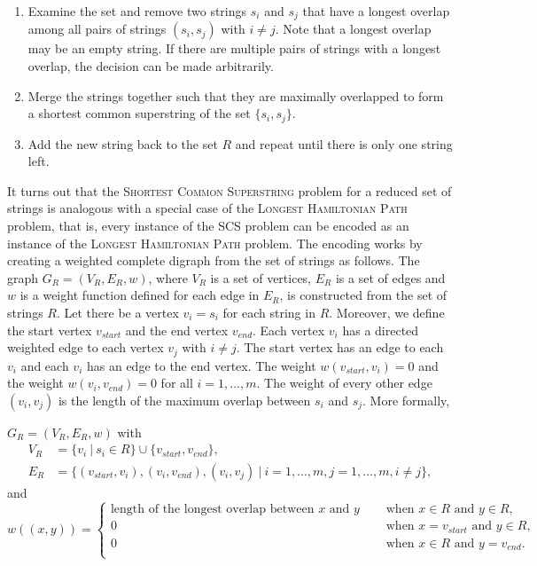 \documentclass[english,twoside,censored,csm,algorithms-track-2020]{HYthesisML}
\theoremstyle{plain}
\theoremstyle{definition}
\begin{document}
\vspace{1cm}
\begin{enumerate}
\item Examine the set and remove two strings $s_i$ and $s_j$ that have a longest overlap among all pairs of strings $(s_i, s_j)$ with $i\neq j$. Note that a longest overlap may be an empty string. If there are multiple pairs of strings with a longest overlap, the decision can be made arbitrarily.
\item Merge the strings together such that they are maximally overlapped to form a shortest common superstring of the set $\{s_i, s_j\}$.
  \item Add the new string back to the set $R$ and repeat until there is only one string left.
\end{enumerate}

It turns out that the \textsc{Shortest Common Superstring} problem for a reduced set of strings is
analogous with a special case of
the \textsc{Longest Hamiltonian Path} problem, that is, every instance of the SCS problem can be encoded
as an instance of the \textsc{Longest Hamiltonian Path} problem. The encoding works by creating a weighted
complete digraph from the set of strings as follows. 
The graph $G_R=(V_R,E_R,w)$, where $V_R$ is a set of vertices, $E_R$ is a set of edges and $w$ is a
 weight function defined for each edge in $E_R$, is constructed from the set of strings $R$.
Let there be a vertex $v_i=s_i$ for each string in $R$. Moreover, we define the start vertex
$v_{start}$ and the end vertex $v_{end}$. Each vertex $v_i$ has a directed weighted edge to each vertex
$v_j$ with $i\neq j$. The start vertex has an edge to each $v_i$ and each $v_i$ has an edge to the
end vertex. The weight $w(v_{start}, v_i) = 0$ and the weight $w(v_i, v_{end}) = 0$ for all $i=1,...,m$.
The weight of every other edge $(v_i, v_j)$ is the length of the maximum overlap between $s_i$ and $s_j$.
More formally,

$G_R=(V_R,E_R,w)$ with
\begin{align*}
  V_R &= \{v_i~|~s_i\in R\} \cup \{v_{start},v_{end}\}, \\
  E_R &= \{(v_{start},v_i), (v_i,v_{end}), (v_i,v_j)~|~i=1,...,m, j=1,...,m, i\neq j\},
\end{align*}
and
\[   
w((x,y)) = 
     \begin{cases}
       \text{length of the longest overlap between } x \text{ and } y &\quad\text{ when } x\in R \text{ and } y\in R,  \\
       0 &\quad\text{ when } x=v_{start} \text{ and } y\in R, \\
       0 &\quad\text{ when } x\in R \text{ and } y=v_{end}. \\
     \end{cases}
     \]
\end{document}
